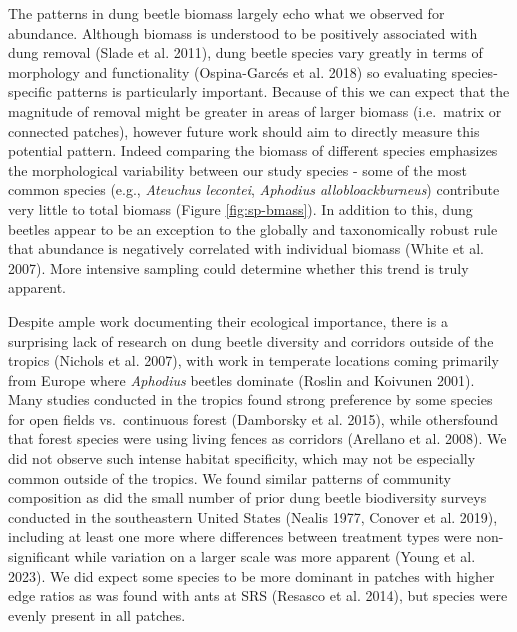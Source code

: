 \documentclass[
  man, donotrepeattitle]{apa6}
\begin{document}
The patterns in dung beetle biomass largely echo what we observed for abundance. Although biomass is understood to be positively associated with dung removal (Slade et al. 2011), dung beetle species vary greatly in terms of morphology and functionality (Ospina-Garcés et al. 2018) so evaluating species-specific patterns is particularly important. Because of this we can expect that the magnitude of removal might be greater in areas of larger biomass (i.e.~matrix or connected patches), however future work should aim to directly measure this potential pattern. Indeed comparing the biomass of different species emphasizes the morphological variability between our study species - some of the most common species (e.g., \emph{Ateuchus lecontei}, \emph{Aphodius allobloackburneus}) contribute very little to total biomass (Figure \ref{fig:sp-bmass}). In addition to this, dung beetles appear to be an exception to the globally and taxonomically robust rule that abundance is negatively correlated with individual biomass (White et al. 2007). More intensive sampling could determine whether this trend is truly apparent.

Despite ample work documenting their ecological importance, there is a surprising lack of research on dung beetle diversity and corridors outside of the tropics (Nichols et al. 2007), with work in temperate locations coming primarily from Europe where \emph{Aphodius} beetles dominate (Roslin and Koivunen 2001). Many studies conducted in the tropics found strong preference by some species for open fields vs.~continuous forest (Damborsky et al. 2015), while othersfound that forest species were using living fences as corridors (Arellano et al. 2008). We did not observe such intense habitat specificity, which may not be especially common outside of the tropics. We found similar patterns of community composition as did the small number of prior dung beetle biodiversity surveys conducted in the southeastern United States (Nealis 1977, Conover et al. 2019), including at least one more where differences between treatment types were non-significant while variation on a larger scale was more apparent (Young et al. 2023). We did expect some species to be more dominant in patches with higher edge ratios as was found with ants at SRS (Resasco et al. 2014), but species were evenly present in all patches.
\end{document}
